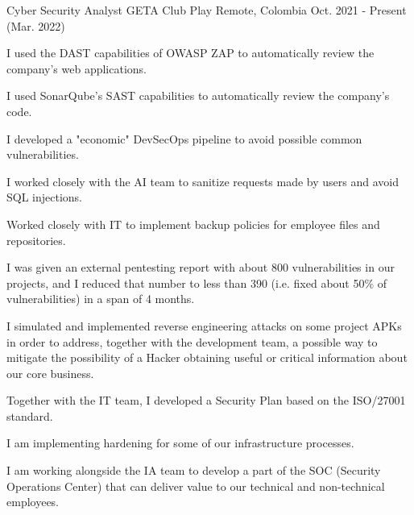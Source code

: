

\begin{cventries}

  \cventry
    {Cyber Security Analyst} %
    {GETA Club Play} %
    {Remote, Colombia} %
    {Oct. 2021 - Present (Mar. 2022)} %
    {
      \begin{cvitems} %
        \item {I used the DAST capabilities of OWASP ZAP to automatically review the company's web
        applications.}
        \item {I used SonarQube's SAST capabilities to automatically review the company's code.}
        \item {I developed a "economic" DevSecOps pipeline to avoid possible common vulnerabilities.}
        \item {I worked closely with the AI team to sanitize requests made by users and avoid SQL
        injections.}
        \item {Worked closely with IT to implement backup policies for employee files and
        repositories.}
        \item {I was given an external pentesting report with about 800 vulnerabilities in our
        projects, and I reduced that number to less than 390 (i.e. fixed about 50\% of
        vulnerabilities) in a span of 4 months.}
        \item {I simulated and implemented reverse engineering attacks on some project APKs in order
        to address, together with the development team, a possible way to mitigate the possibility
        of a Hacker obtaining useful or critical information about our core business.}
        \item {Together with the IT team, I developed a Security Plan based on the ISO/27001
        standard.}
        \item {I am implementing hardening for some of our infrastructure processes.}
        \item {I am working alongside the IA team to develop a part of the SOC (Security Operations
        Center) that can deliver value to our technical and non-technical employees.}
      \end{cvitems}
    }


\end{cventries}
